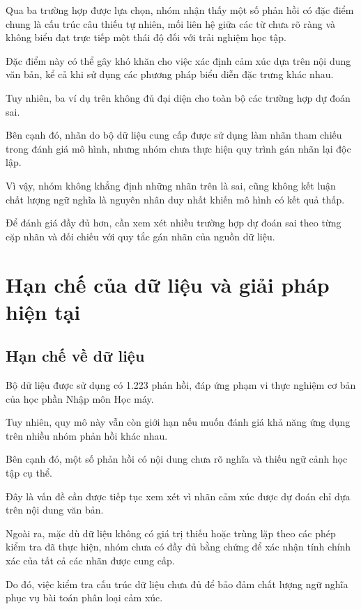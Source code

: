 Qua ba trường hợp được lựa chọn, nhóm
nhận thấy một số phản hồi có đặc điểm
chung là cấu trúc câu thiếu tự nhiên,
mối liên hệ giữa các từ chưa rõ ràng
và không biểu đạt trực tiếp một thái độ
đối với trải nghiệm học tập.

Đặc điểm này có thể gây khó khăn cho
việc xác định cảm xúc dựa trên nội dung
văn bản, kể cả khi sử dụng các phương
pháp biểu diễn đặc trưng khác nhau.

Tuy nhiên, ba ví dụ trên không đủ
đại diện cho toàn bộ các trường hợp
dự đoán sai.

Bên cạnh đó, nhãn do bộ dữ liệu cung cấp
được sử dụng làm nhãn tham chiếu trong
đánh giá mô hình, nhưng nhóm chưa thực
hiện quy trình gán nhãn lại độc lập.

Vì vậy, nhóm không khẳng định những
nhãn trên là sai, cũng không kết luận
chất lượng ngữ nghĩa là nguyên nhân duy
nhất khiến mô hình có kết quả thấp.

Để đánh giá đầy đủ hơn, cần xem xét
nhiều trường hợp dự đoán sai theo từng
cặp nhãn và đối chiếu với quy tắc
gán nhãn của nguồn dữ liệu.



\section{Hạn chế của dữ liệu và giải pháp hiện tại}

\subsection{Hạn chế về dữ liệu}

Bộ dữ liệu được sử dụng có 1.223 phản hồi,
đáp ứng phạm vi thực nghiệm cơ bản của
học phần Nhập môn Học máy.

Tuy nhiên, quy mô này vẫn còn giới hạn
nếu muốn đánh giá khả năng ứng dụng
trên nhiều nhóm phản hồi khác nhau.

Bên cạnh đó, một số phản hồi có nội dung
chưa rõ nghĩa và thiếu ngữ cảnh học tập
cụ thể.

Đây là vấn đề cần được tiếp tục xem xét
vì nhãn cảm xúc được dự đoán chỉ dựa
trên nội dung văn bản.

Ngoài ra, mặc dù dữ liệu không có
giá trị thiếu hoặc trùng lặp theo
các phép kiểm tra đã thực hiện,
nhóm chưa có đầy đủ bằng chứng để
xác nhận tính chính xác của tất cả
các nhãn được cung cấp.

Do đó, việc kiểm tra cấu trúc dữ liệu
chưa đủ để bảo đảm chất lượng ngữ nghĩa
phục vụ bài toán phân loại cảm xúc.


